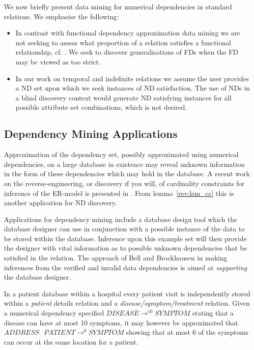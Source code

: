 We now briefly present data mining for numerical dependencies in
standard relations. We emphasise the following:
\begin{itemize}
\item In contrast with functional dependency approximation data mining
we are not seeking to assess what proportion of a relation satisfies a
functional relationship, cf. \cite{hkp98,km95}. We seek to discover
generalisations of FDs when the FD may be viewed as too strict.
\item In our work on temporal and indefinite relations we assume the
user provides a ND set upon which we seek instances of ND
satisfaction. The use of NDs in a blind discovery context would
generate ND satisfying instances for all possible attribute set
combinations, which is not desired.
\end{itemize}

\subsection{Dependency Mining Applications}\label{subsec:fd_jobs}
Approximation of the dependency set, possibly approximated using numerical
dependencies, on a large database in existence may reveal unknown information
in the form of these dependencies which may hold in the database. A
recent work on the reverse-engineering, or discovery if you will, of
cardinality constraints for inference of the ER-model is presented in
\cite{sou98}. From lemma~\ref{rev:lem_cc} this is another application
for ND discovery.

\smallskip

Applications for dependency mining include a database
design tool which the database designer can use in conjunction with a possible
instance of the data to be stored within the database.  Inference upon this 
example set will then provide the designer with vital information as to possible
unknown dependencies that be satisfied in the relation. The approach of 
Bell and Brockhausen \cite{bb95} in making inferences from the verified and
invalid data dependencies is aimed at {\em supporting} the database
designer. 


\begin{example}
\begin{rm}
In a patient database within a hospital every patient visit is independently stored
within a {\em patient} details relation and a {\em disease/symptom/treatment} relation. 
Given a numerical dependency specified $DISEASE \to^{10} SYMPTOM$ stating
that a disease can have at most 10 symptoms, it may however be approximated
that $ADDRESS \: \: \: PATIENT \to^{6} SYMPTOM$ showing that at most
6 of the symptoms can occur at the same location for a patient.
\end{rm}
\end{example}


